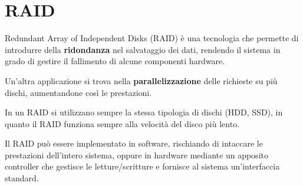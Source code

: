 \section{RAID}
Redundant Array of Independent Disks (RAID) è una tecnologia che permette di introdurre della \textbf{ridondanza} nel salvataggio dei dati, rendendo il sistema in grado di gestire il fallimento di alcune componenti hardware.

Un'altra applicazione si trova nella \textbf{parallelizzazione} delle richieste su più dischi, aumentandone così le prestazioni.

\spacer
In un RAID si utilizzano sempre la stessa tipologia di dischi (HDD, SSD), in quanto il RAID funziona sempre alla velocità del disco più lento.

\spacer
Il RAID può essere implementato in software, rischiando di intaccare le prestazioni dell'intero sistema, oppure in hardware mediante un apposito controller che gestisce le letture/scritture e fornisce al sistema un'interfaccia standard.


